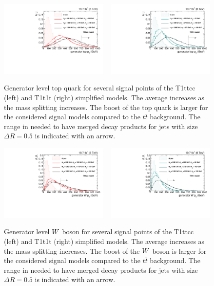 \begin{figure}[htpb]
\centering
\includegraphics[width=0.48\textwidth]{figures/razor_strategy/T1ttcc_gentoppt}
~
\includegraphics[width=0.48\textwidth]{figures/razor_strategy/T1t1t_gentoppt}
\caption{Generator level top quark \pt for several signal points of the T1ttcc (left) and T1t1t
(right) simplified models. The average \pt increases as the mass splitting increases. The boost of
the top quark is larger for the considered signal models compared to the $t\bar{t}$ background. 
The range in \pt needed to have merged decay products for jets with size $\Delta R = 0.5$ is
indicated with an arrow. 
\label{fig:boost_gen_toppt}}
\end{figure}
\begin{figure}[htpb]
\centering
\includegraphics[width=0.48\textwidth]{figures/razor_strategy/T1ttcc_genWpt}
~
\includegraphics[width=0.48\textwidth]{figures/razor_strategy/T1t1t_genWpt}
\caption{Generator level $W$ boson \pt for several signal points of the T1ttcc (left) and T1t1t
(right)
simplified models. The average \pt increases as the mass splitting increases. The boost of the $W$
boson is larger for the considered signal models compared to the $t\bar{t}$ background. 
The range in \pt needed to have merged decay products for jets with size $\Delta R = 0.5$ is
indicated with an arrow.
\label{fig:boost_gen_Wpt}}
\end{figure}

